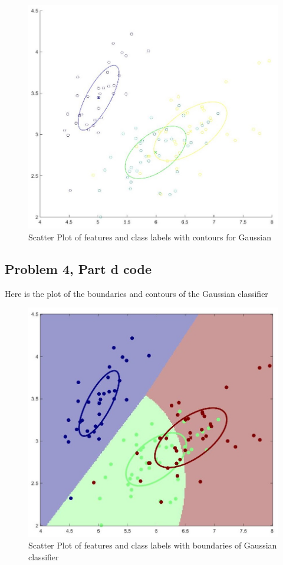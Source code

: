 \documentclass[11pt,psfig]{article}
\begin{document}
\begin{figure}[H]
\centering
\includegraphics[width=\columnwidth]{prob4cScatter.jpg}
\caption{Scatter Plot of features and class labels with contours for Gaussian}
\end{figure}

\newpage

\subsection*{Problem 4, Part d code}

Here is the plot of the boundaries and contours of the Gaussian classifier

\begin{figure}[H]
\centering
\includegraphics[width=\columnwidth]{prob4dPlot.jpg}
\caption{Scatter Plot of features and class labels with boundaries of Gaussian classifier}
\end{figure}
\end{document}
